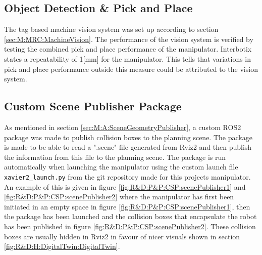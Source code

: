 \subsection{Object Detection \& Pick and Place}
The tag based machine vision system was set up according to section \ref{sec:M:MRC:MachineVision}. The performance of the vision system is verified by testing the combined pick and place performance of the manipulator. Interbotix states a repeatability of 1[mm] for the manipulator\cite{interbotix_vx300}. This tells that variations in pick and place performance outside this measure could be attributed to the vision system.

\subsection{Custom Scene Publisher Package}
As mentioned in section \ref{sec:M:A:SceneGeometryPublisher}, a custom ROS2 package was made to publish collision boxes to the planning scene. The package is made to be able to read a ".scene" file generated from Rviz2 and then publish the information from this file to the planning scene. The package is run automatically when launching the manipulator using the custom launch file \lstinline{xavier2_launch.py} from the git repository made for this projects manipulator\cite{husky_vx300_repo}. An example of this is given in figure \ref{fig:R&D:P&P:CSP:scenePublisher1} and  \ref{fig:R&D:P&P:CSP:scenePublisher2} where the manipulator has first been initiated in an empty space in figure \ref{fig:R&D:P&P:CSP:scenePublisher1}, then the package has been launched and the collision boxes that encapsulate the robot has been published in figure \ref{fig:R&D:P&P:CSP:scenePublisher2}. These collision boxes are usually hidden in Rviz2 in favour of nicer visuals shown in section \ref{fig:R&D:H:DigitalTwin:DigitalTwin}.

